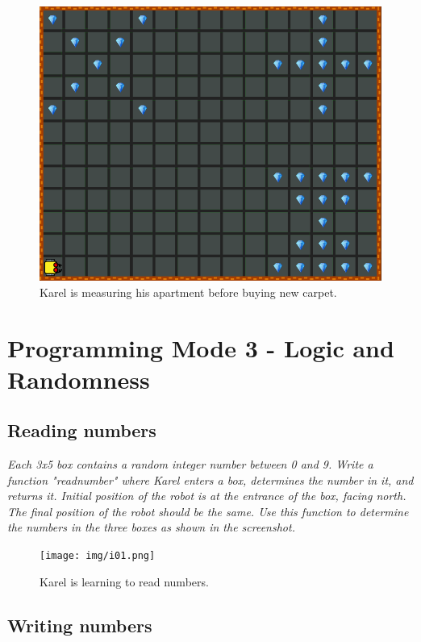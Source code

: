 \begin{figure}[!ht]
\begin{center}
\includegraphics[height=0.4\textwidth]{img/h04.png}
\end{center}
\vspace{-4mm}
\caption{Karel is measuring his apartment before buying new carpet.}
\vspace{-1cm}
\label{fig:h04}
\end{figure}

\newpage
\section{Programming Mode 3 - Logic and Randomness}

\subsection{Reading numbers}

{\em Each 3x5 box contains a random integer number between 0 and 9. Write a function "readnumber" 
where Karel enters a box, determines the number in it, and returns it. Initial position of the 
robot is at the entrance of the box, facing north. The final position of the robot should be the same. 
Use this function to determine the numbers in the three boxes as shown in the screenshot. }

\begin{figure}[!ht]
\begin{center}
\texttt{[image: img/i01.png]}
\end{center}
\vspace{-4mm}
\caption{Karel is learning to read numbers.}
\label{fig:g10}
\end{figure}


\newpage

\subsection{Writing numbers}

